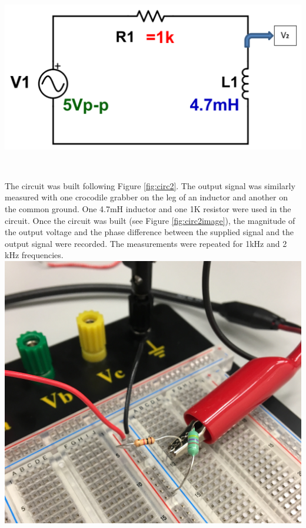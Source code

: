 \documentclass[journal]{IEEEtran}
\begin{document}
\begingroup
    \centering
    \medskip
    \includegraphics[width=\columnwidth]{images/lab8_circuit2.png}
    \label{fig:circ2}
    \medskip
\endgroup

\\
\medskip


\noindent The circuit was built following Figure \ref{fig:circ2}. The output signal was similarly measured with one crocodile grabber on the leg of an inductor and another on the common ground. One 4.7mH inductor and one 1K \ohm resistor were used in the circuit. Once the circuit was built (see Figure \ref{fig:circ2image}), the magnitude of the output voltage and the phase difference between the supplied signal and the output signal were recorded. The measurements were repeated for 1kHz and 2 kHz frequencies. \\

\begingroup
    \centering
    \medskip
    \includegraphics[width=\columnwidth]{images/lab8_circ2.jpg}
    \label{fig:circ2image}
    \medskip
\endgroup
\end{document}
